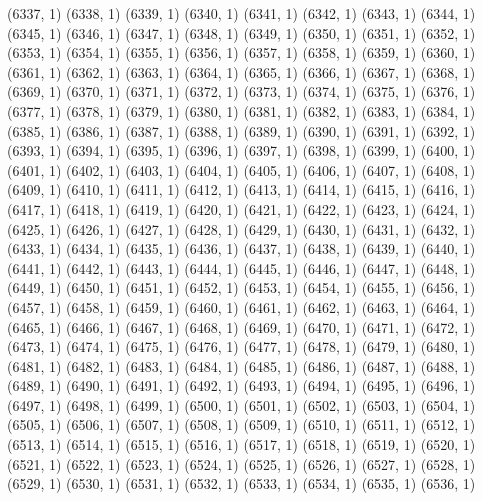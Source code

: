 {   (6337, 1)
   (6338, 1)
   (6339, 1)
   (6340, 1)
   (6341, 1)
   (6342, 1)
   (6343, 1)
   (6344, 1)
   (6345, 1)
   (6346, 1)
   (6347, 1)
   (6348, 1)
   (6349, 1)
   (6350, 1)
   (6351, 1)
   (6352, 1)
   (6353, 1)
   (6354, 1)
   (6355, 1)
   (6356, 1)
   (6357, 1)
   (6358, 1)
   (6359, 1)
   (6360, 1)
   (6361, 1)
   (6362, 1)
   (6363, 1)
   (6364, 1)
   (6365, 1)
   (6366, 1)
   (6367, 1)
   (6368, 1)
   (6369, 1)
   (6370, 1)
   (6371, 1)
   (6372, 1)
   (6373, 1)
   (6374, 1)
   (6375, 1)
   (6376, 1)
   (6377, 1)
   (6378, 1)
   (6379, 1)
   (6380, 1)
   (6381, 1)
   (6382, 1)
   (6383, 1)
   (6384, 1)
   (6385, 1)
   (6386, 1)
   (6387, 1)
   (6388, 1)
   (6389, 1)
   (6390, 1)
   (6391, 1)
   (6392, 1)
   (6393, 1)
   (6394, 1)
   (6395, 1)
   (6396, 1)
   (6397, 1)
   (6398, 1)
   (6399, 1)
   (6400, 1)
   (6401, 1)
   (6402, 1)
   (6403, 1)
   (6404, 1)
   (6405, 1)
   (6406, 1)
   (6407, 1)
   (6408, 1)
   (6409, 1)
   (6410, 1)
   (6411, 1)
   (6412, 1)
   (6413, 1)
   (6414, 1)
   (6415, 1)
   (6416, 1)
   (6417, 1)
   (6418, 1)
   (6419, 1)
   (6420, 1)
   (6421, 1)
   (6422, 1)
   (6423, 1)
   (6424, 1)
   (6425, 1)
   (6426, 1)
   (6427, 1)
   (6428, 1)
   (6429, 1)
   (6430, 1)
   (6431, 1)
   (6432, 1)
   (6433, 1)
   (6434, 1)
   (6435, 1)
   (6436, 1)
   (6437, 1)
   (6438, 1)
   (6439, 1)
   (6440, 1)
   (6441, 1)
   (6442, 1)
   (6443, 1)
   (6444, 1)
   (6445, 1)
   (6446, 1)
   (6447, 1)
   (6448, 1)
   (6449, 1)
   (6450, 1)
   (6451, 1)
   (6452, 1)
   (6453, 1)
   (6454, 1)
   (6455, 1)
   (6456, 1)
   (6457, 1)
   (6458, 1)
   (6459, 1)
   (6460, 1)
   (6461, 1)
   (6462, 1)
   (6463, 1)
   (6464, 1)
   (6465, 1)
   (6466, 1)
   (6467, 1)
   (6468, 1)
   (6469, 1)
   (6470, 1)
   (6471, 1)
   (6472, 1)
   (6473, 1)
   (6474, 1)
   (6475, 1)
   (6476, 1)
   (6477, 1)
   (6478, 1)
   (6479, 1)
   (6480, 1)
   (6481, 1)
   (6482, 1)
   (6483, 1)
   (6484, 1)
   (6485, 1)
   (6486, 1)
   (6487, 1)
   (6488, 1)
   (6489, 1)
   (6490, 1)
   (6491, 1)
   (6492, 1)
   (6493, 1)
   (6494, 1)
   (6495, 1)
   (6496, 1)
   (6497, 1)
   (6498, 1)
   (6499, 1)
   (6500, 1)
   (6501, 1)
   (6502, 1)
   (6503, 1)
   (6504, 1)
   (6505, 1)
   (6506, 1)
   (6507, 1)
   (6508, 1)
   (6509, 1)
   (6510, 1)
   (6511, 1)
   (6512, 1)
   (6513, 1)
   (6514, 1)
   (6515, 1)
   (6516, 1)
   (6517, 1)
   (6518, 1)
   (6519, 1)
   (6520, 1)
   (6521, 1)
   (6522, 1)
   (6523, 1)
   (6524, 1)
   (6525, 1)
   (6526, 1)
   (6527, 1)
   (6528, 1)
   (6529, 1)
   (6530, 1)
   (6531, 1)
   (6532, 1)
   (6533, 1)
   (6534, 1)
   (6535, 1)
   (6536, 1)
}
